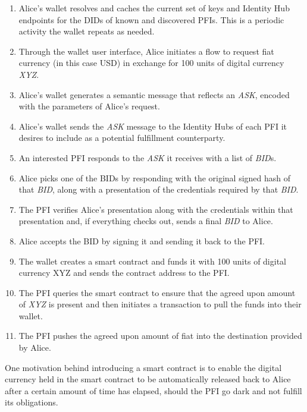 \documentclass[11pt]{article}
\begin{document}
\begin{enumerate}
	\item Alice’s wallet resolves and caches the current set of keys and Identity Hub endpoints for the DIDs of known and discovered PFIs. This is a periodic activity the wallet repeats as needed.

	\item Through the wallet user interface, Alice initiates a flow to request fiat currency (in this case USD) in exchange for 100 units of digital currency \textit{XYZ}.

	\item Alice’s wallet generates a semantic message that reflects an \textit{ASK}, encoded with the parameters of Alice’s request.  

	\item Alice’s wallet sends the \textit{ASK} message to the Identity Hubs of each PFI it desires to include as a potential fulfillment counterparty.

	\item An interested PFI responds to the \textit{ASK} it receives with a list of \textit{BID}s. 

	\item Alice picks one of the BIDs by responding with the original signed hash of that \textit{BID}, along with a presentation of the credentials required by that \textit{BID}. 

	\item The PFI verifies Alice’s presentation along with the credentials within that presentation and, if everything checks out, sends a final \textit{BID} to Alice.

	\item Alice accepts the BID by signing it and sending it back to the PFI.

	\item The wallet creates a smart contract and funds it with 100 units of digital currency XYZ and sends the contract address to the PFI.

	\item The PFI queries the smart contract to ensure that the agreed upon amount of \textit{XYZ} is present and then initiates a transaction to pull the funds into their wallet.

	\item The PFI pushes the agreed upon amount of fiat into the destination provided by Alice.

\vspace{1\baselineskip}
\end{enumerate}
One motivation behind introducing a smart contract is to enable the digital currency held in the smart contract to be automatically released back to Alice after a certain amount of time has elapsed, should the PFI go dark and not fulfill its obligations.
\end{document}
